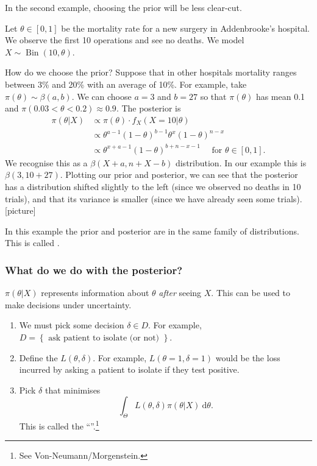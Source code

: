 \documentclass[egregdoesnotlikesansseriftitles,a4paper]{scrartcl}
\begin{document}
In the second example, choosing the prior will be less clear-cut.
\begin{example*}
      Let $\theta \in [0,1]$ be the mortality rate for a new surgery in Addenbrooke's hospital. We observe the first 10 operations and see no deaths. We model $X \sim \operatorname{Bin}\left(10,\theta \right)$.

      How do we choose the prior? Suppose that in other hospitals mortality ranges between 3\% and 20\% with an average of 10\%. For example, take $\pi \left(\theta \right)\sim \beta \left(a,b\right)$. We can choose $a=3$ and $b=27$ so that $\pi \left(\theta \right)$ has mean 0.1 and $\pi \left(0.03<\theta <0.2\right) \approx 0.9$. The posterior is 
      \begin{align*}
          \pi \left(\theta |X\right)&\propto \pi \left(\theta \right) \cdot f_{X}\left(X=10|\theta \right)\\
          &\propto \theta ^{a-1} \left(1-\theta \right)^{b-1} \theta ^{x}\left(1-\theta \right)^{n-x}\\
          &\propto \theta ^{x+a-1}\left(1-\theta \right)^{b+n-x-1}\quad \text{ for } \theta \in [0,1].
      \end{align*}
      We recognise this as a $\beta \left(X+a, n+X-b\right)$ distribution. In our example this is $\beta \left(3,10+27\right)$. Plotting our prior and posterior, we can see that the posterior has a distribution shifted slightly to the left (since we observed no deaths in 10 trials), and that its variance is smaller (since we have already seen some trials).
      [picture]
      \begin{remark}
            In this example the prior and posterior are in the same family of distributions. This is called .
      \end{remark}
\end{example*}
\subsubsection*{What do we do with the posterior?}
$\pi \left(\theta |X\right)$ represents information about $\theta $ \emph{after} seeing $X$. This can be used to make decisions under uncertainty.
\begin{enumerate}
     \item We must pick some decision $\delta \in D$. For example, $D=\left\{\text{ ask patient to isolate (or not) } \right\}$.
     \item Define the  $L \left(\theta ,\delta \right)$. For example, $L \left(\theta =1, \delta =1\right)$ would be the loss incurred by asking a patient to isolate if they test positive. 
     \item Pick $\delta $ that minimises \[
     \int_{\Theta }^{}L \left(\theta ,\delta \right) \pi \left(\theta |X\right)\ \mathrm{d}\theta 
     .\] This is called the ``''.\footnote{See Von-Neumann/Morgenstein.}
\end{enumerate}
\end{document}

